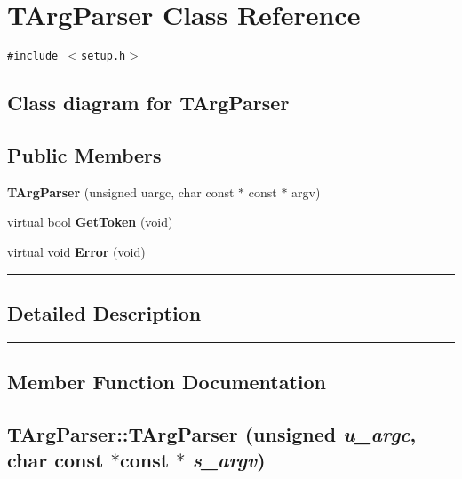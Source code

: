 \section{TArgParser  Class Reference}
\label{TArgParser}


{\tt \#include $<$setup.h$>$}

\subsection*{Class diagram for TArgParser}
\begin{figure}[H]
\begin{center}
\leavevmode
\setlength{\epsfysize}{2cm}
\end{center}
\end{figure}
\subsection*{Public Members}
\begin{CompactItemize}
\item 
{\bf TArg\-Parser} (unsigned uargc, char const $\ast$ const $\ast$ argv)
\item 
virtual bool {\bf Get\-Token} (void)
\item 
virtual void {\bf Error} (void)
\end{CompactItemize}
\vspace{0.4cm}\hrule\vspace{0.2cm}
\subsection*{Detailed Description}
\vspace{0.4cm}\hrule\vspace{0.2cm}
\subsection*{Member Function Documentation}
\label{TArgParser_a0}
\subsection{\setlength{\rightskip}{0pt plus 5cm}TArg\-Parser::TArg\-Parser (unsigned {\em u\_\-argc}, char const $\ast$const $\ast$ {\em s\_\-argv})}

\label{TArgParser_a1}

